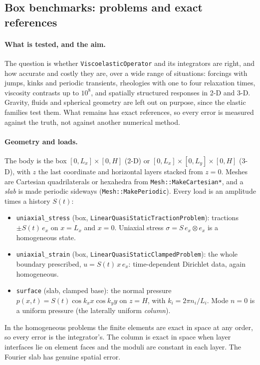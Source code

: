 \documentclass[11pt]{article}
\numberwithin{equation}{section}
\newcommand{\code}[1]{\texttt{#1}}
\begin{document}
\subsection{Box benchmarks: problems and exact references}
\label{sec:box}

\paragraph{What is tested, and the aim.}
The question is whether \code{ViscoelasticOperator} and its integrators
are right, and how accurate and costly they are, over a wide range of
situations: forcings with jumps, kinks and periodic transients, rheologies
with one to four relaxation times, viscosity contrasts up to $10^8$, and
spatially structured responses in 2-D and 3-D. Gravity, fluids and
spherical geometry are left out on purpose, since the elastic families
test them. What remains has exact references, so every error is measured
against the truth, not against another numerical method.

\paragraph{Geometry and loads.}
The body is the box $[0,L_x]\times[0,H]$ (2-D) or
$[0,L_x]\times[0,L_y]\times[0,H]$ (3-D), with $z$ the last coordinate and
horizontal layers stacked from $z=0$. Meshes are Cartesian quadrilaterals
or hexahedra from \code{Mesh::MakeCartesian*}, and a \emph{slab} is made
periodic sideways (\code{Mesh::MakePeriodic}). Every load is an amplitude
times a history $S(t)$:
\begin{itemize}[leftmargin=*]
\item \code{uniaxial\_stress} (box, \code{LinearQuasiStaticTractionProblem}):
  tractions $\pm S(t)\,e_x$ on $x=L_x$ and $x=0$. Uniaxial stress
  $\sigma=S\,e_x\otimes e_x$ is a homogeneous state.
\item \code{uniaxial\_strain} (box, \code{LinearQuasiStaticClampedProblem}):
  the whole boundary prescribed, $u=S(t)\,x\,e_x$: time-dependent
  Dirichlet data, again homogeneous.
\item \code{surface} (slab, clamped base): the normal pressure
  $p(x,t)=S(t)\cos k_xx\cos k_yy$ on $z=H$, with $k_i=2\pi n_i/L_i$. Mode
  $n=0$ is a uniform pressure (the laterally uniform \emph{column}).
\end{itemize}
In the homogeneous problems the finite elements are exact in space at any
order, so every error is the integrator's. The column is exact in space
when layer interfaces lie on element faces and the moduli are constant
in each layer. The Fourier slab has genuine spatial error.
\end{document}
